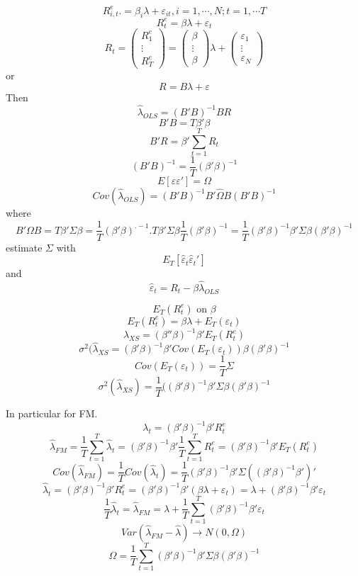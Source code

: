 \documentclass[11pt, a4paper, oneside]{article}
\theoremstyle{definition}
\theoremstyle{proposition}
\theoremstyle{corollary}
\theoremstyle{lemma}
\theoremstyle{theorem}
\begin{document}
$$R_{i, t}^e. = \beta_i \lambda + \varepsilon_{it}, i = 1, \cdots, N; t = 1, \cdots T$$
$$R_t^e = \beta  \lambda + \varepsilon_t$$
$$R_t = \begin{pmatrix} R^e_{1} \\ \vdots \\ R^e_{T}\end{pmatrix} = \begin{pmatrix} \beta \\ \vdots \\ \beta\end{pmatrix} \lambda + \begin{pmatrix} \varepsilon_{1} \\ \vdots \\ \varepsilon_{N}\end{pmatrix}$$
or 
$$R = B \lambda + \varepsilon$$
Then
$$\hat{\lambda}_{OLS} = (B'B)^{-1}BR$$
$$B'B = T\beta'\beta$$
$$B'R = \beta'\sum_{t=1}^T R_t$$
$$(B'B)^{-1} = \frac{1}{T}(\beta'\beta)^{-1}$$
$$E[\varepsilon \varepsilon'] = \Omega$$ 
$$Cov(\hat{\lambda}_{OLS}) = (B'B)^{-1}B'\hat{\Omega} B(B'B)^{-1}$$
where $$B'\Omega B = T\beta'\Sigma\beta = \frac{1}{T}(\beta'\beta)^{. -1 }.T\beta'\Sigma\beta\frac{1}{T}(\beta'\beta)^{-1} = \frac{1}{T}(\beta'\beta)^{-1}\beta'\Sigma\beta(\beta'\beta)^{-1}$$
estimate $\Sigma$ with $$E_T[\hat{\varepsilon}_t\hat{\varepsilon}_t']$$ and $$\hat{\varepsilon}_t = R_t - \beta\hat{\lambda}_{OLS}$$

$$E_T(R_t^e ) \text{ on } \beta$$
$$E_T(R_t^e ) = \beta \lambda + E_T(\varepsilon_t)$$
$$\lambda_{XS} = (\beta''\beta)^{-1}\beta'E_T(R_t^e) $$
$$\sigma^2(\hat{\lambda}_{XS} = (\beta'\beta)^{-1}\beta'Cov(E_T( \varepsilon_t))\beta(\beta'\beta)^{-1}$$
$$Cov(E_T(\varepsilon_t)) = \frac{1}{T}\Sigma$$
$$\sigma^2(\hat{\lambda}_{XS}) = \frac{1}{T}((\beta'\beta)^{-1}\beta'\Sigma\beta(\beta'\beta)^{-1}$$


In particular for FM. 
$$\lambda_t = (\beta'\beta)^{-1}\beta'R_t^e$$
$$\hat{\lambda}_{FM} = \frac{1}{T}\sum_{t=1}^T\hat{\lambda}_t =  (\beta'\beta)^{-1}\beta'\frac{1}{T}\sum_{t=1}^T R_t^e =  (\beta'\beta)^{-1}\beta'E_T(R_t^e)$$
$$Cov(\hat{\lambda}_{FM}) = \frac{1}{T}Cov(\hat{\lambda}_{t}) = \frac{1}{T}(\beta'\beta)^{-1}\beta'\Sigma((\beta'\beta)^{-1}\beta')'$$
$$\hat{\lambda}_{t} = (\beta'\beta)^{-1}\beta'R_t^e = (\beta'\beta)^{-1}\beta'(\beta \lambda + \varepsilon_t) = \lambda + (\beta'\beta)^{-1}\beta'\varepsilon_t $$
$$ \frac{1}{T}\hat{\lambda}_{t}  = \hat{\lambda}_{FM} = \lambda + \frac{1}{T} \sum_{t=1}^T(\beta'\beta)^{-1}\beta'\varepsilon_t$$
$$Var(\hat{\lambda}_{FM} - \hat{\lambda}) \to N(0, \Omega)$$
$$\Omega = \frac{1}{T} \sum_{t=1}^T(\beta'\beta)^{-1}\beta'\Sigma\beta(\beta'\beta)^{-1}$$
\end{document}
